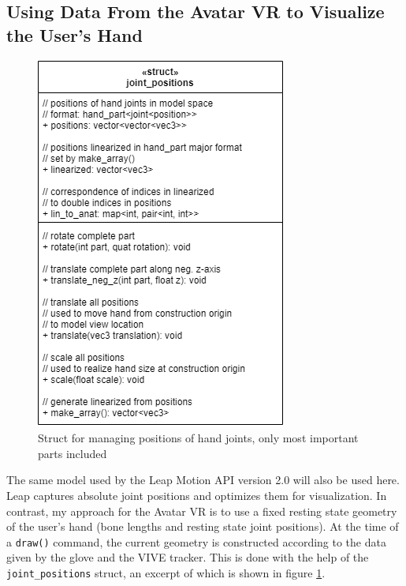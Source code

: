 \documentclass[hyperref, bachelorofscience]{cgvpub}
\begin{document}
\subsection{Using Data From the Avatar VR to Visualize the User's Hand} \label{subsec:avr_to_hand}
\begin{figure}
	\includegraphics[width=\linewidth]{../pics/joint_positions}
	\caption{Struct for managing positions of hand joints, only most important parts included}
	\label{fig:joint_positions}
	\vspace{1cm}
\end{figure}

The same model used by the Leap Motion API version 2.0 will also be used here. Leap captures absolute joint positions and optimizes them for visualization. In contrast, my approach for the Avatar VR is to use a fixed resting state geometry of the user's hand (bone lengths and resting state joint positions). At the time of a \lstinline|draw()| command, the current geometry is constructed according to the data given by the glove and the \Gls{VIVE} tracker. This is done with the help of the \lstinline|joint_positions| struct, an excerpt of which is shown in figure \ref{fig:joint_positions}.
\end{document}
